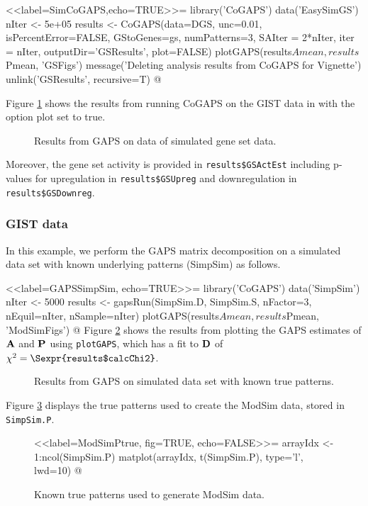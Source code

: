 \documentclass{report}
\begin{document}
<<label=SimCoGAPS,echo=TRUE>>=
library('CoGAPS')
data('EasySimGS')
nIter <- 5e+05 
results <- CoGAPS(data=DGS, unc=0.01, isPercentError=FALSE,
                  GStoGenes=gs,
                  numPatterns=3,
                  SAIter = 2*nIter, iter = nIter,
                  outputDir='GSResults', plot=FALSE)
plotGAPS(results$Amean, results$Pmean, 'GSFigs')
message('Deleting analysis results from CoGAPS for Vignette')
unlink('GSResults', recursive=T)
@

Figure \ref{fig:GS} shows the results from running CoGAPS on the GIST data in \cite{Ochs2009} with the option plot set to true.
\begin{figure}[ht]
\begin{center}
\end{center}
\caption{Results from GAPS on data of simulated gene set data.}
\label{fig:GS}
\end{figure}

\par Moreover, the gene set activity is provided in \texttt{results\$GSActEst} including p-values for upregulation in \texttt{results\$GSUpreg} and downregulation in \texttt{results\$GSDownreg}.

\subsubsection{GIST data}
\par In this example, we perform the GAPS matrix decomposition on a simulated data set with known underlying patterns (SimpSim) as follows.

<<label=GAPSSimpSim, echo=TRUE>>=
library('CoGAPS')
data('SimpSim')
nIter <- 5000
results <- gapsRun(SimpSim.D, SimpSim.S, nFactor=3,
		nEquil=nIter, nSample=nIter)
plotGAPS(results$Amean, results$Pmean, 'ModSimFigs')
@ 
Figure \ref{fig:ModSim} shows the results from plotting the GAPS estimates of ${\bf{A}}$ and ${\bf{P}}$ using \texttt{plotGAPS}, which has a fit to ${\bf{D}}$ of $\chi^{2}=\Sexpr{results$calcChi2}$.  
\begin{figure}[ht]
  \begin{center}
  \end{center}
  \caption{Results from GAPS on simulated data set with known true patterns.}
  \label{fig:ModSim}
\end{figure}
Figure \ref{fig:ModSimPtrue} displays the true patterns used to create the ModSim data, stored in \texttt{SimpSim.P}.
\begin{figure}[ht]
  \begin{center}
<<label=ModSimPtrue, fig=TRUE, echo=FALSE>>=
arrayIdx <- 1:ncol(SimpSim.P)
matplot(arrayIdx, t(SimpSim.P), type='l', lwd=10)
@ 
  \end{center}
  \caption{Known true patterns used to generate ModSim data.}
  \label{fig:ModSimPtrue}
\end{figure}
\end{document}

